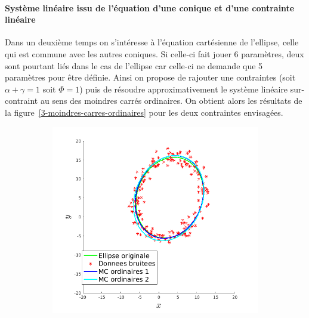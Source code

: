\documentclass{article}
\begin{document}
\paragraph{Système linéaire issu de l'équation d'une conique et d'une contrainte linéaire}
Dans un deuxième temps on s'intéresse à l'équation cartésienne de l'ellipse, celle qui est commune avec les autres coniques. Si celle-ci fait jouer 6 paramètres, deux sont pourtant liés dans le cas de l'ellipse car celle-ci ne demande que 5 paramètres pour être définie. Ainsi on propose de rajouter une contraintes (soit $\alpha + \gamma = 1$ soit $\Phi = 1$) puis de résoudre approximativement le système linéaire sur-contraint au sens des moindres carrés ordinaires. On obtient alors les résultats de la figure~\ref{3-moindres-carres-ordinaires} pour les deux contraintes envisagées.
\begin{figure}[!ht]
    \centering
    \begin{subfigure}[c]{0.49\linewidth}
        \centering
        \includegraphics[width=\linewidth]{images/4-mco_1.png}
    \end{subfigure}
    \begin{subfigure}[c]{0.49\linewidth}
        \centering

\end{subfigure}
\end{figure}
\end{document}
